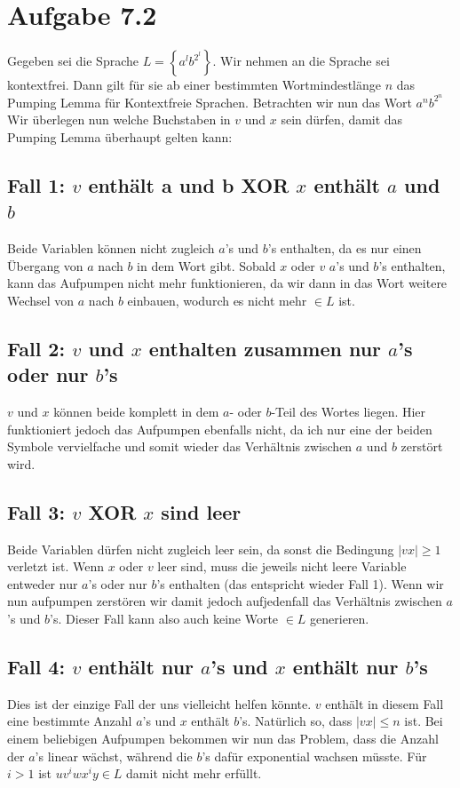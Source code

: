\documentclass{article}
\begin{document}
\section*{Aufgabe 7.2}
Gegeben sei die Sprache $L = \left\{ a^lb^{2^l} \right\}$. Wir nehmen an die Sprache sei kontextfrei. Dann gilt für sie ab einer bestimmten Wortmindestlänge $n$ das Pumping Lemma für Kontextfreie Sprachen. Betrachten wir nun das Wort $a^nb^{2^n}$ Wir überlegen nun welche Buchstaben in $v$ und $x$ sein dürfen, damit das Pumping Lemma überhaupt gelten kann:

\subsection*{Fall 1: $v$ enthält a und b XOR $x$ enthält $a$ und $b$}
Beide Variablen können nicht zugleich $a$'s und $b$'s enthalten, da es nur einen Übergang von $a$ nach $b$ in dem Wort gibt. Sobald $x$ oder $v$ $a$'s und $b$'s enthalten, kann das Aufpumpen nicht mehr funktionieren, da wir dann in das Wort weitere Wechsel von $a$ nach $b$ einbauen, wodurch es nicht mehr $\in L$ ist.

\subsection*{Fall 2: $v$ und $x$ enthalten zusammen nur $a$'s oder nur $b$'s}
$v$ und $x$ können beide komplett in dem $a$- oder $b$-Teil des Wortes liegen. Hier funktioniert jedoch das Aufpumpen ebenfalls nicht, da ich nur eine der beiden Symbole vervielfache und somit wieder das Verhältnis zwischen $a$ und $b$ zerstört wird.

\subsection*{Fall 3: $v$ XOR $x$ sind leer}
Beide Variablen dürfen nicht zugleich leer sein, da sonst die Bedingung $|vx|\geq 1$ verletzt ist. Wenn $x$ oder $v$ leer sind, muss die jeweils nicht leere Variable entweder nur $a$'s oder nur $b$'s enthalten (das entspricht wieder Fall 1). Wenn wir nun aufpumpen zerstören wir damit jedoch aufjedenfall das Verhältnis zwischen $a$'s und $b$'s. Dieser Fall kann also auch keine Worte $\in L$ generieren.

\subsection*{Fall 4: $v$ enthält nur $a$'s und $x$ enthält nur $b$'s}
Dies ist der einzige Fall der uns vielleicht helfen könnte. $v$ enthält in diesem Fall eine bestimmte Anzahl $a$'s und $x$ enthält $b$'s. Natürlich so, dass $|vx| \leq n$ ist. Bei einem beliebigen Aufpumpen bekommen wir nun das Problem, dass die Anzahl der $a$'s linear wächst, während die $b$'s dafür exponential wachsen müsste. Für $i>1$ ist $uv^iwx^iy\in L$ damit nicht mehr erfüllt.
\end{document}
